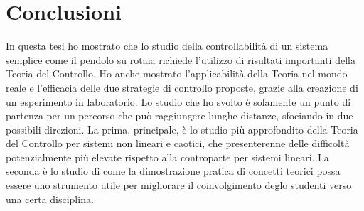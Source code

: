 \chapter{Conclusioni}
In questa tesi ho mostrato che lo studio della
controllabilità di un sistema semplice come il
pendolo su rotaia richiede l'utilizzo di risultati importanti della
Teoria del Controllo.
Ho anche mostrato l'applicabilità della Teoria nel mondo reale e
l'efficacia delle due strategie di controllo proposte,
grazie alla creazione di un esperimento in laboratorio.
Lo studio che ho svolto è solamente un punto di partenza
per un percorso che può raggiungere lunghe distanze,
sfociando in due possibili direzioni.
La prima, principale, è lo studio più approfondito della Teoria del Controllo
per sistemi non lineari e caotici, che presenterenne delle difficoltà
potenzialmente più elevate rispetto alla controparte per sistemi lineari.
La seconda è lo studio di come la dimostrazione
pratica di concetti teorici possa essere uno strumento utile per migliorare il
coinvolgimento deglo studenti verso una certa disciplina.
